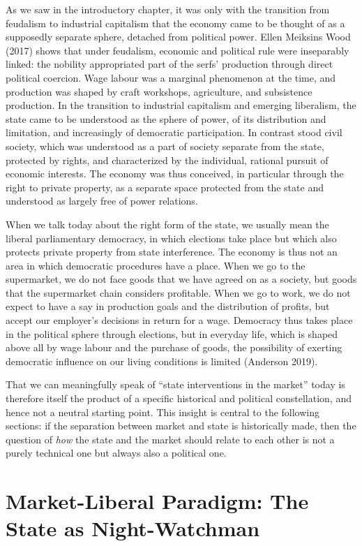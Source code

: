 \documentclass[
  british,
  a4paper,
  DIV=11,
  numbers=noendperiod,
  oneside,
  openany]{scrreprt}
\begin{document}
As we saw in the introductory chapter, it was only with the transition
from feudalism to industrial capitalism that the economy came to be
thought of as a supposedly separate sphere, detached from political
power. Ellen Meiksins Wood (2017) shows that under feudalism, economic
and political rule were inseparably linked: the nobility appropriated
part of the serfs' production through direct political coercion. Wage
labour was a marginal phenomenon at the time, and production was shaped
by craft workshops, agriculture, and subsistence production. In the
transition to industrial capitalism and emerging liberalism, the state
came to be understood as the sphere of power, of its distribution and
limitation, and increasingly of democratic participation. In contrast
stood civil society, which was understood as a part of society separate
from the state, protected by rights, and characterized by the
individual, rational pursuit of economic interests. The economy was thus
conceived, in particular through the right to private property, as a
separate space protected from the state and understood as largely free
of power relations.

When we talk today about the right form of the state, we usually mean
the liberal parliamentary democracy, in which elections take place but
which also protects private property from state interference. The
economy is thus not an area in which democratic procedures have a place.
When we go to the supermarket, we do not face goods that we have agreed
on as a society, but goods that the supermarket chain considers
profitable. When we go to work, we do not expect to have a say in
production goals and the distribution of profits, but accept our
employer's decisions in return for a wage. Democracy thus takes place in
the political sphere through elections, but in everyday life, which is
shaped above all by wage labour and the purchase of goods, the
possibility of exerting democratic influence on our living conditions is
limited (Anderson 2019).

That we can meaningfully speak of ``state interventions in the market''
today is therefore itself the product of a specific historical and
political constellation, and hence not a neutral starting point. This
insight is central to the following sections: if the separation between
market and state is historically made, then the question of \emph{how}
the state and the market should relate to each other is not a purely
technical one but always also a political one.

\section{Market-Liberal Paradigm: The State as
Night-Watchman}\label{market-liberal-paradigm-the-state-as-night-watchman}
\end{document}
